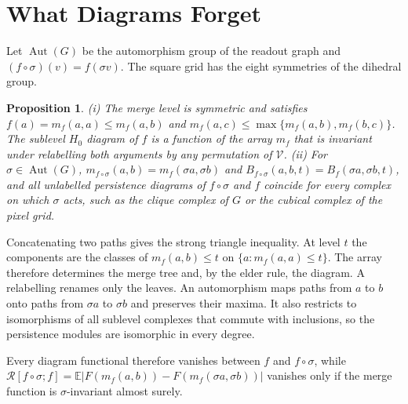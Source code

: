\documentclass[10pt,conference]{IEEEtran}
\newtheorem{proposition}{Proposition}
\newcommand{\E}{\mathbb E}
\newcommand{\Aut}{\operatorname{Aut}}
\begin{document}
\section{What Diagrams Forget}
Let $\Aut(G)$ be the automorphism group of the readout graph and $(f\circ\sigma)(v)=f(\sigma v)$. The square grid has the eight symmetries of the dihedral group.
\begin{proposition}\label{prop:aut}
(i) The merge level is symmetric and satisfies $f(a)=m_f(a,a)\le m_f(a,b)$ and $m_f(a,c)\le\max\{m_f(a,b),m_f(b,c)\}$. The sublevel $H_0$ diagram of $f$ is a function of the array $m_f$ that is invariant under relabelling both arguments by any permutation of $\mathcal V$. (ii) For $\sigma\in\Aut(G)$, $m_{f\circ\sigma}(a,b)=m_f(\sigma a,\sigma b)$ and $B_{f\circ\sigma}(a,b,t)=B_f(\sigma a,\sigma b,t)$, and all unlabelled persistence diagrams of $f\circ\sigma$ and $f$ coincide for every complex on which $\sigma$ acts, such as the clique complex of $G$ or the cubical complex of the pixel grid.
\end{proposition}
\begin{IEEEproof}
Concatenating two paths gives the strong triangle inequality. At level $t$ the components are the classes of $m_f(a,b)\le t$ on $\{a:m_f(a,a)\le t\}$. The array therefore determines the merge tree and, by the elder rule, the diagram. A relabelling renames only the leaves. An automorphism maps paths from $a$ to $b$ onto paths from $\sigma a$ to $\sigma b$ and preserves their maxima. It also restricts to isomorphisms of all sublevel complexes that commute with inclusions, so the persistence modules are isomorphic in every degree.
\end{IEEEproof}
Every diagram functional therefore vanishes between $f$ and $f\circ\sigma$, while $\mathcal R[f\circ\sigma;f]=\E|F(m_f(a,b))-F(m_f(\sigma a,\sigma b))|$ vanishes only if the merge function is $\sigma$-invariant almost surely.
\end{document}
